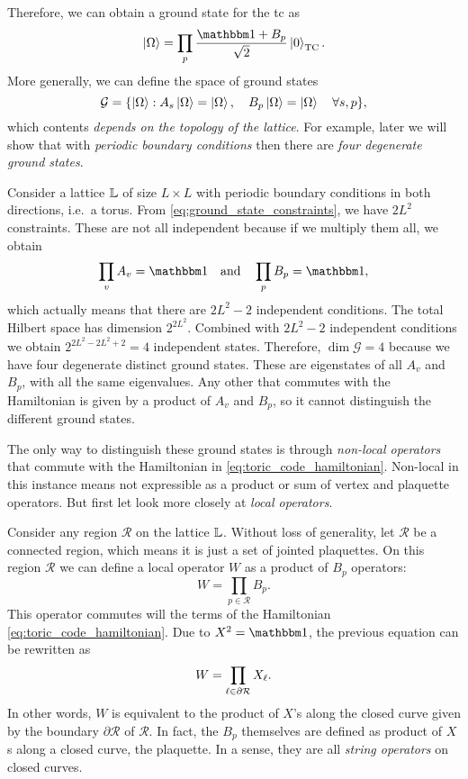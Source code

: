 Therefore, we can obtain a ground state for the \ac{tc} as
\begin{equation}
    \ket{\Omega} = \prod_{p} \frac{\identity + B_p}{\sqrt{2}} \ket{0}_{\text{TC}}.
\end{equation}
More generally, we can define the space of ground states
\begin{equation}
    \mathcal{G} = \qty{ \ket{\Omega} : A_s \ket{\Omega} = \ket{\Omega}, \quad B_p \ket{\Omega} = \ket{\Omega} \quad \forall s, p },
    \label{eq:TC_protected_subspace}
\end{equation}
which contents \emph{depends on the topology of the lattice}.
For example, later we will show that with \emph{periodic boundary conditions} then there are
\emph{four degenerate ground states}.


Consider a lattice $\mathbb{L}$ of size $L \times L$ with periodic boundary conditions in both directions, i.e.~a torus.
From \eqref{eq:ground_state_constraints}, we have $2L^2$ constraints.
These are not all independent because if we multiply them all, we obtain
\begin{equation}
    \prod_{v} A_v = \identity \qand
    \prod_{p} B_p = \identity,
\end{equation}
which actually means that there are $2L^2 - 2$ independent conditions.
The total Hilbert space has dimension $2^{2L^2}$.
Combined with $2L^2 - 2$ independent conditions we obtain $2^{2L^2 - 2L^2 + 2} = 4$ independent states.
Therefore, $\dim \mathcal{G} = 4$ because we have four degenerate distinct ground states.
These are eigenstates of all $A_v$ and $B_p$, with all the same eigenvalues.
Any other that commutes with the Hamiltonian is given by a product of $A_v$ and $B_p$, so it cannot distinguish the different ground states.


The only way to distinguish these ground states is through \emph{non-local operators} that commute with the Hamiltonian in \eqref{eq:toric_code_hamiltonian}.
Non-local in this instance means not expressible as a product or sum of vertex and plaquette operators.
But first let look more closely at \emph{local operators}.


Consider any region $\mathcal{R}$ on the lattice $\mathbb{L}$.
Without loss of generality, let $\mathcal{R}$ be a connected region, which means it is just a set of jointed plaquettes.
On this region $\mathcal{R}$ we can define a local operator $W$ as a product of $B_p$ operators:
\begin{equation}
    W = \prod_{p \in \mathcal{R}} B_p.
\end{equation}
This operator commutes will the terms of the Hamiltonian \eqref{eq:toric_code_hamiltonian}.
Due to $X^2 = \identity$, the previous equation can be rewritten as
\begin{equation}
    W = \prod_{\ell \in \partial \mathcal{R}} X_{\ell}.
\end{equation}
In other words, $W$ is equivalent to the product of $X$'s along the closed curve given by the boundary $\partial \mathcal{R}$ of $\mathcal{R}$.
In fact, the $B_p$ themselves are defined as product of $X$s along a closed curve, the plaquette.
In a sense, they are all \emph{string operators} on closed curves.

